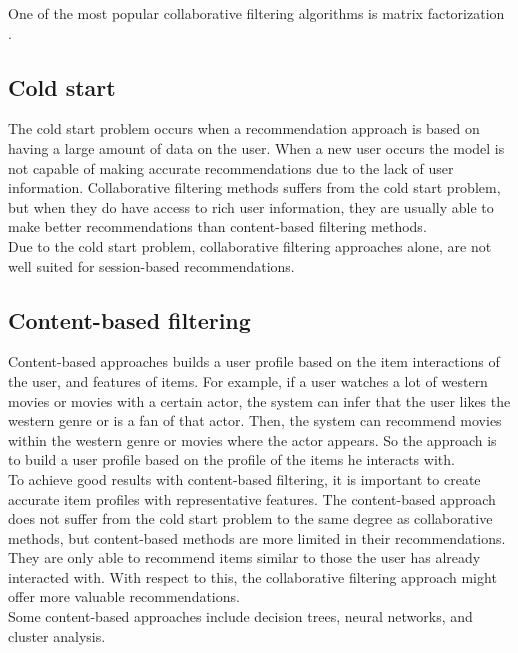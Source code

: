 One of the most popular collaborative filtering algorithms is matrix factorization \cite{matrix-factorization}.

\subsection{Cold start}
The cold start problem occurs when a recommendation approach is based on having a large amount of data on the user. When a new user occurs the model is not capable of making accurate recommendations due to the lack of user information. Collaborative filtering methods suffers from the cold start problem, but when they do have access to rich user information, they are usually able to make better recommendations than content-based filtering methods.\\

Due to the cold start problem, collaborative filtering approaches alone, are not well suited for session-based recommendations.

\subsection{Content-based filtering}
Content-based approaches builds a user profile based on the item interactions of the user, and features of items. For example, if a user watches a lot of western movies or movies with a certain actor, the system can infer that the user likes the western genre or is a fan of that actor. Then, the system can recommend movies within the western genre or movies where the actor appears. So the approach is to build a user profile based on the profile of the items he interacts with.\\

To achieve good results with content-based filtering, it is important to create accurate item profiles with representative features. The content-based approach does not suffer from the cold start problem to the same degree as collaborative methods, but content-based methods are more limited in their recommendations. They are only able to recommend items similar to those the user has already interacted with. With respect to this, the collaborative filtering approach might offer more valuable recommendations.\\

Some content-based approaches include decision trees, neural networks, and cluster analysis.


